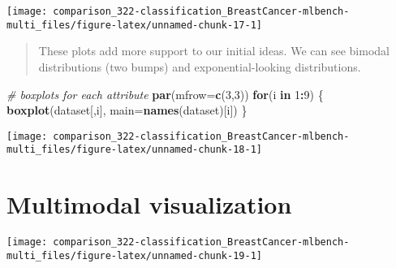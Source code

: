 \documentclass[]{book}
\newenvironment{Shaded}{\begin{snugshade}}{\end{snugshade}}
\newcommand{\CommentTok}[1]{\textcolor[rgb]{0.56,0.35,0.01}{\textit{#1}}}
\newcommand{\ControlFlowTok}[1]{\textcolor[rgb]{0.13,0.29,0.53}{\textbf{#1}}}
\newcommand{\DataTypeTok}[1]{\textcolor[rgb]{0.13,0.29,0.53}{#1}}
\newcommand{\DecValTok}[1]{\textcolor[rgb]{0.00,0.00,0.81}{#1}}
\newcommand{\KeywordTok}[1]{\textcolor[rgb]{0.13,0.29,0.53}{\textbf{#1}}}
\newcommand{\NormalTok}[1]{#1}
\newcommand{\OperatorTok}[1]{\textcolor[rgb]{0.81,0.36,0.00}{\textbf{#1}}}
\newcommand{\StringTok}[1]{\textcolor[rgb]{0.31,0.60,0.02}{#1}}
\begin{document}
\begin{center}\texttt{[image: comparison\_322-classification\_BreastCancer-mlbench-multi\_files/figure-latex/unnamed-chunk-17-1]} \end{center}

\begin{quote}
These plots add more support to our initial ideas. We can see bimodal distributions (two bumps) and exponential-looking distributions.
\end{quote}

\begin{Shaded}
\begin{Highlighting}[]
\CommentTok{# boxplots for each attribute}
\KeywordTok{par}\NormalTok{(}\DataTypeTok{mfrow=}\KeywordTok{c}\NormalTok{(}\DecValTok{3}\NormalTok{,}\DecValTok{3}\NormalTok{))}
\ControlFlowTok{for}\NormalTok{(i }\ControlFlowTok{in} \DecValTok{1}\OperatorTok{:}\DecValTok{9}\NormalTok{) \{}
    \KeywordTok{boxplot}\NormalTok{(dataset[,i], }\DataTypeTok{main=}\KeywordTok{names}\NormalTok{(dataset)[i])}
\NormalTok{\}}
\end{Highlighting}
\end{Shaded}

\begin{center}\texttt{[image: comparison\_322-classification\_BreastCancer-mlbench-multi\_files/figure-latex/unnamed-chunk-18-1]} \end{center}

\hypertarget{multimodal-visualization}{%
\section{Multimodal visualization}\label{multimodal-visualization}}

\begin{Shaded}
\end{Shaded}

\begin{center}\texttt{[image: comparison\_322-classification\_BreastCancer-mlbench-multi\_files/figure-latex/unnamed-chunk-19-1]} \end{center}
\end{document}
